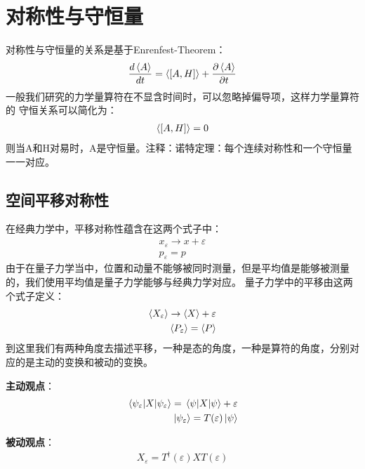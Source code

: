 \documentclass[UTF8]{article}
\numberwithin{equation}{section}
\begin{document}
\section{对称性与守恒量}
对称性与守恒量的关系是基于Enrenfest-Theorem：
\begin{align*}
    \frac{d\expval{A}}{dt}=\expval{[A,H]}+\pdv{\expval{A}}{t}
\end{align*}
一般我们研究的力学量算符在不显含时间时，可以忽略掉偏导项，这样力学量算符的
守恒关系可以简化为：
\begin{align*}
    \expval{[A,H]}=0
\end{align*}
则当A和H对易时，A是守恒量。注释：诺特定理：每个连续对称性和一个守恒量
一一对应。
\subsection{空间平移对称性}
在经典力学中，平移对称性蕴含在这两个式子中：
\begin{align*}
    x_{\varepsilon}\rightarrow x+\varepsilon \\
    p_{\varepsilon}=p
\end{align*}
由于在量子力学当中，位置和动量不能够被同时测量，但是平均值是能够被测量的，我们使用平均值是量子力学能够与经典力学对应。
量子力学中的平移由这两个式子定义：
\begin{align*}
    \expval{X_{\varepsilon}}\rightarrow \expval{X}+\varepsilon \\
    \expval{P_{\varepsilon}}=\expval{P}
\end{align*}
到这里我们有两种角度去描述平移，一种是态的角度，一种是算符的角度，分别对应的是主动的变换和被动的变换。

\textbf{主动观点}：
\begin{align*}
    \expval{X}{\psi_{\varepsilon}}=\expval{X}{\psi}+\varepsilon \\
    \ket{\psi_{\varepsilon}}=T(\varepsilon)\ket{\psi}
\end{align*}

\textbf{被动观点}：
\begin{align*}
    X_{\varepsilon}=T^\dagger(\varepsilon)XT(\varepsilon)
\end{align*}
\end{document}
